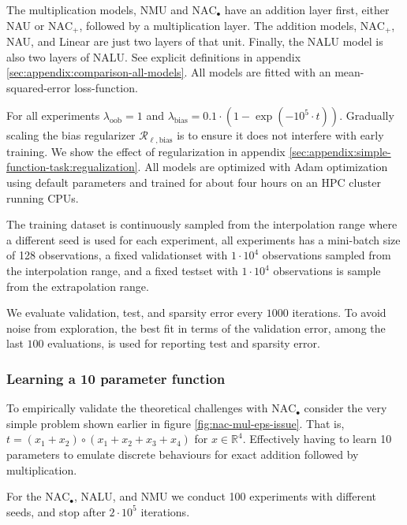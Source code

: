 The multiplication models, NMU and $\mathrm{NAC}_{\bullet}$ have an addition layer first, either NAU or $\mathrm{NAC}_{+}$, followed by a multiplication layer. The addition models, $\mathrm{NAC}_{+}$, NAU, and Linear are just two layers of that unit. Finally, the NALU model is also two layers of NALU. See explicit definitions in appendix \ref{sec:appendix:comparison-all-models}. All models are fitted with an mean-squared-error loss-function.

For all experiments $\lambda_{\mathrm{oob}} = 1$ and $\lambda_{\mathrm{bias}} = 0.1 \cdot (1 - \exp(-10^5 \cdot t))$. Gradually scaling the bias regularizer $\mathcal{R}_{\ell,\mathrm{bias}}$ is to ensure it does not interfere with early training. We show the effect of regularization in appendix \ref{sec:appendix:simple-function-task:regualization}. All models are optimized with Adam optimization \cite{adam-optimization} using default parameters and trained for about four hours on an HPC cluster running  CPUs.

The training dataset is continuously sampled from the interpolation range where a different seed is used for each experiment, all experiments has a mini-batch size of 128 observations, a fixed validationset with $1 \cdot 10^4$ observations sampled from the interpolation range, and a fixed testset with $1 \cdot 10^4$ observations is sample from the extrapolation range.

We evaluate validation, test, and sparsity error every $1000$ iterations. To avoid noise from exploration, the best fit in terms of the validation error, among the last $100$ evaluations, is used for reporting test and sparsity error.

\subsubsection{Learning a 10 parameter function}

To empirically validate the theoretical challenges with $\mathrm{NAC}_{\bullet}$ consider the very simple problem shown earlier in figure \ref{fig:nac-mul-eps-issue}. That is, $t = (x_1 + x_2) \circ (x_1 + x_2 + x_3 + x_4)$ for $x \in \mathbb{R}^4$.
Effectively having to learn 10 parameters to emulate discrete behaviours for exact addition followed by multiplication.

For the $\mathrm{NAC}_{\bullet}$, NALU, and NMU we conduct 100 experiments with different seeds, and stop after $2 \cdot 10^5$ iterations.

